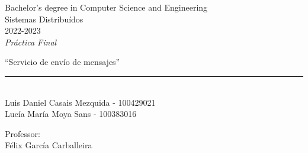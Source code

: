 \begin{titlepage}
    \begin{sffamily}
    \color{azulUC3M}
    \begin{center}
        \begin{figure}[H]
        \end{figure}
        \vspace{1.5cm}
        \begin{Large}
            Bachelor's degree in Computer Science and Engineering\\
            Sistemas Distribuídos\\
            2022-2023\\
            \vspace{2cm}
            \textsl{Práctica Final}
            \bigskip

        \end{Large}
            {\Huge ``Servicio de envío de mensajes''}\\
            \vspace*{0.5cm}
            \rule{10.5cm}{0.1mm}\\
            \vspace*{0.9cm}
            {\LARGE Luis Daniel Casais Mezquida - 100429021}\\
            \vspace*{0.2cm}
            {\LARGE Lucía María Moya Sans - 100383016}\\
            \vspace*{0.2cm}

            \vspace*{0.8cm}
        \begin{Large}
            Professor:\\
            Félix García Carballeira\\
        \end{Large}
    \end{center}
    \vfill

    \end{sffamily}
\end{titlepage}